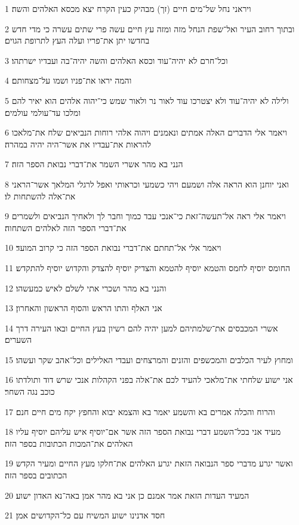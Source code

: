 \par 1 ויראני נחל של־מים חיים (זך) מבהיק כעין הקרח יצא מכסא האלהים והשה׃
\par 2 ובתוך רחוב העיר ואל־שפת הנחל מזה ומזה עץ חיים עשה פרי שתים עשרה כי מדי חדש בחדשו יתן את־פריו ועלה העץ לתרופת הגוים׃
\par 3 וכל־חרם לא יהיה־עוד וכסא האלהים והשה יהיה־בה ועבדיו ישרתהו׃
\par 4 והמה יראו את־פניו ושמו על־מצחותם׃
\par 5 ולילה לא יהיה־עוד ולא יצטרכו עוד לאור נר ולאור שמש כי־יהוה אלהים הוא יאיר להם ומלכו עד־עולמי עולמים׃
\par 6 ויאמר אלי הדברים האלה אמתים ונאמנים ויהוה אלהי רוחות הנביאים שלח את־מלאכו להראות את־עבדיו את אשר־היה יהיה במהרה׃
\par 7 הנני בא מהר אשרי השמר את־דברי נבואת הספר הזה׃
\par 8 ואני יוחנן הוא הראה אלה ושמעם ויהי כשמעי וכראותי ואפל לרגלי המלאך אשר־הראני את־אלה להשתחות לו׃
\par 9 ויאמר אלי ראה אל־תעשה־זאת כי־אנכי עבד כמוך וחבר לך ולאחיך הנביאים ולשמרים את־דברי הספר הזה לאלהים השתחוה׃
\par 10 ויאמר אלי אל־תחתם את־דברי נבואת הספר הזה כי קרוב המועד׃
\par 11 החומס יוסיף לחמס והטמא יוסיף להטמא והצדיק יוסיף להצדק והקדוש יוסיף להתקדש׃
\par 12 והנני בא מהר ושכרי אתי לשלם לאיש כמעשהו׃
\par 13 אני האלף והתו הראש והסוף הראשון והאחרון׃
\par 14 אשרי המכבסים את־שלמתיהם למען יהיה להם רשיון בעץ החיים ובאו העירה דרך השערים׃
\par 15 ומחוץ לעיר הכלבים והמכשפים והזנים והמרצחים ועבדי האלילים וכל־אהב שקר ועשהו׃
\par 16 אני ישוע שלחתי את־מלאכי להעיד לכם את־אלה בפני הקהלות אנכי שרש דוד ותולדתו כוכב נגה השחר׃
\par 17 והרוח והכלה אמרים בא והשמע יאמר בא והצמא יבוא והחפץ יקח מים חיים חנם׃
\par 18 מעיד אני בכל־השמע דברי נבואת הספר הזה אשר אם־יוסיף איש עליהם יוסיף עליו האלהים את־המכות הכתובות בספר הזה׃
\par 19 ואשר יגרע מדברי ספר הנבואה הזאת יגרע האלהים את־חלקו מעץ החיים ומעיר הקדש הכתובים בספר הזה׃
\par 20 המעיד העדות הזאת אמר אמנם כן אני בא מהר אמן באה־נא האדון ישוע׃
\par 21 חסד אדנינו ישוע המשיח עם כל־הקדושים אמן׃


